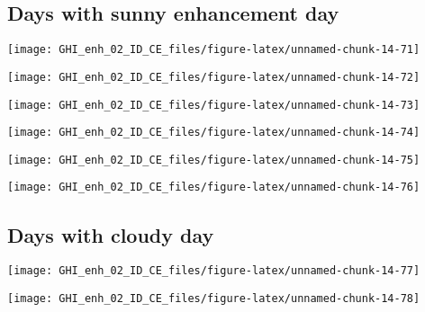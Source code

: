 \documentclass[
  10pt,
  a4paper,oneside]{article}
\begin{document}
\FloatBarrier

\hypertarget{days-with-sunny-enhancement-day}{%
\subsection{Days with sunny enhancement day}\label{days-with-sunny-enhancement-day}}

\begin{center}\texttt{[image: GHI\_enh\_02\_ID\_CE\_files/figure-latex/unnamed-chunk-14-71]} \end{center}

\begin{center}\texttt{[image: GHI\_enh\_02\_ID\_CE\_files/figure-latex/unnamed-chunk-14-72]} \end{center}

\begin{center}\texttt{[image: GHI\_enh\_02\_ID\_CE\_files/figure-latex/unnamed-chunk-14-73]} \end{center}

\begin{center}\texttt{[image: GHI\_enh\_02\_ID\_CE\_files/figure-latex/unnamed-chunk-14-74]} \end{center}

\begin{center}\texttt{[image: GHI\_enh\_02\_ID\_CE\_files/figure-latex/unnamed-chunk-14-75]} \end{center}

\begin{center}\texttt{[image: GHI\_enh\_02\_ID\_CE\_files/figure-latex/unnamed-chunk-14-76]} \end{center}

\FloatBarrier

\hypertarget{days-with-cloudy-day}{%
\subsection{Days with cloudy day}\label{days-with-cloudy-day}}

\begin{center}\texttt{[image: GHI\_enh\_02\_ID\_CE\_files/figure-latex/unnamed-chunk-14-77]} \end{center}

\begin{center}\texttt{[image: GHI\_enh\_02\_ID\_CE\_files/figure-latex/unnamed-chunk-14-78]} \end{center}
\end{document}
